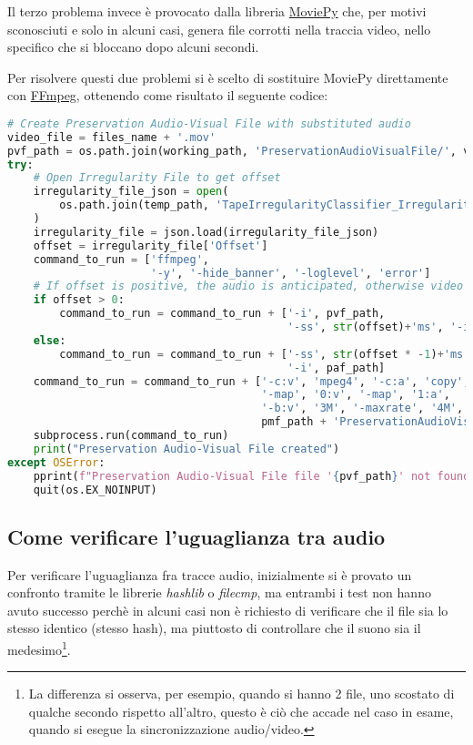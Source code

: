 Il terzo problema invece è provocato dalla libreria \href{https://zulko.github.io/moviepy/}{MoviePy} che, per motivi sconosciuti e solo in alcuni casi, genera file corrotti nella traccia video, nello specifico che si bloccano dopo alcuni secondi.  %

Per risolvere questi due problemi si è scelto di sostituire MoviePy direttamente con \href{https://ffmpeg.org/}{FFmpeg}, ottenendo come risultato il seguente codice:
\begin{lstlisting}[language=Python, caption=Codice finale; creazione PreservationAudioVisualFile]
# Create Preservation Audio-Visual File with substituted audio
video_file = files_name + '.mov'
pvf_path = os.path.join(working_path, 'PreservationAudioVisualFile/', video_file)
try:
    # Open Irregularity File to get offset
    irregularity_file_json = open(
        os.path.join(temp_path, 'TapeIrregularityClassifier_IrregularityFileOutput2.json')
    )
    irregularity_file = json.load(irregularity_file_json)
    offset = irregularity_file['Offset']
    command_to_run = ['ffmpeg',
                      '-y', '-hide_banner', '-loglevel', 'error']
    # If offset is positive, the audio is anticipated, otherwise video is anticipated (through seek)
    if offset > 0:
        command_to_run = command_to_run + ['-i', pvf_path,
                                           '-ss', str(offset)+'ms', '-i', paf_path]
    else:
        command_to_run = command_to_run + ['-ss', str(offset * -1)+'ms', '-i', pvf_path,
                                           '-i', paf_path]
    command_to_run = command_to_run + ['-c:v', 'mpeg4', '-c:a', 'copy',
                                       '-map', '0:v', '-map', '1:a',
                                       '-b:v', '3M', '-maxrate', '4M', '-bufsize', '4M',
                                       pmf_path + 'PreservationAudioVisualFile.mov']
    subprocess.run(command_to_run)
    print("Preservation Audio-Visual File created")
except OSError:
    pprint(f"Preservation Audio-Visual File file '{pvf_path}' not found!", color=Color.RED)
    quit(os.EX_NOINPUT)
\end{lstlisting}


\subsection{Come verificare l'uguaglianza tra audio}  %
Per verificare l'uguaglianza fra tracce audio, inizialmente si è provato un confronto tramite le librerie \textit{hashlib} o \textit{filecmp}, ma entrambi i test non hanno avuto successo perchè in alcuni casi non è richiesto di verificare che il file sia lo stesso identico (stesso hash), ma piuttosto di controllare che il suono sia il medesimo\footnote{La differenza si osserva, per esempio, quando si hanno 2 file, uno scostato di qualche secondo rispetto all'altro, questo è ciò che accade nel caso in esame, quando si esegue la sincronizzazione audio/video.}.

